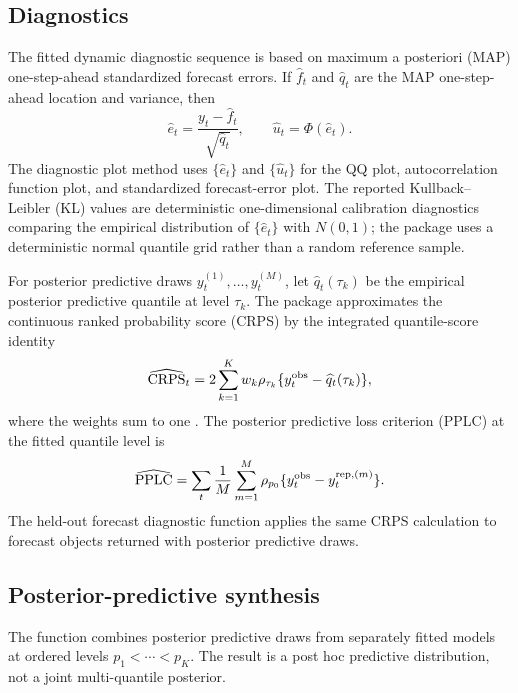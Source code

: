 \subsection{Diagnostics}

The fitted dynamic diagnostic sequence is based on maximum a posteriori (MAP)
one-step-ahead standardized forecast errors. If $\widehat f_t$ and
$\widehat q_t$ are the MAP one-step-ahead location and variance, then
\begin{equation}
\widehat e_t = \frac{y_t-\widehat f_t}{\sqrt{\widehat q_t}},
\qquad
\widehat u_t = \Phi(\widehat e_t).
\label{eq:pit_plugin}
\end{equation}
The diagnostic plot method uses $\{\widehat e_t\}$ and $\{\widehat u_t\}$ for
the QQ plot, autocorrelation function plot, and standardized forecast-error
plot. The reported Kullback--Leibler (KL) values are deterministic
one-dimensional calibration diagnostics comparing the empirical distribution
of $\{\widehat e_t\}$ with $N(0,1)$; the package uses a deterministic normal
quantile grid rather than a random reference sample.

For posterior predictive draws $y_t^{(1)},\ldots,y_t^{(M)}$, let
$\widehat q_t(\tau_k)$ be the empirical posterior predictive quantile at
level $\tau_k$. The package approximates the continuous ranked probability
score (CRPS) by the integrated quantile-score identity
\begin{equation}
\widehat{\operatorname{CRPS}}_t
=
2\sum_{k=1}^{K}
w_k
\rho_{\tau_k}\{y_t^{\mathrm{obs}}-\widehat q_t(\tau_k)\},
\label{eq:crps_estimator}
\end{equation}
where the weights sum to one \citep{gneiting2007,laio2007verification}. The
posterior predictive loss criterion (PPLC) at the fitted quantile level is
\begin{equation}
\widehat{\operatorname{PPLC}}
=
\sum_t
\frac{1}{M}\sum_{m=1}^M
\rho_{p_0}\{y_t^{\mathrm{obs}}-y_t^{\mathrm{rep},(m)}\}.
\label{eq:pplc_estimator}
\end{equation}
The held-out forecast diagnostic function applies the same CRPS calculation
to forecast objects returned with posterior predictive draws.

\subsection{Posterior-predictive synthesis}

The function  combines posterior predictive draws
from separately fitted models at ordered levels $p_1<\cdots<p_K$. The result
is a post hoc predictive distribution, not a joint multi-quantile posterior.

